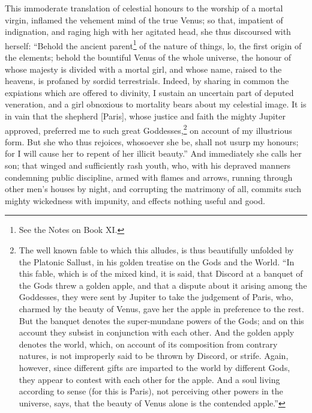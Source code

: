 \documentclass[12pt]{article}
\begin{document}
This immoderate translation of celestial honours to the worship of a mortal
virgin, inflamed the vehement mind of the true Venus; so that, impatient of
indignation, and raging high with her agitated head, she thus discoursed with
herself: ``Behold the ancient parent\footnote{See the Notes on Book XI.} of the
nature of things, lo, the first origin of the elements; behold the bountiful
Venus of the whole universe, the honour of whose majesty is divided with a
mortal girl, and whose name, raised to the heavens, is profaned by sordid
terrestrials. Indeed, by sharing in common the expiations which are offered to
divinity, I sustain an uncertain part of deputed veneration, and a girl
obnoxious to mortality bears about my celestial image. It is in vain that the
shepherd [Paris], whose justice and faith the mighty Jupiter approved,
preferred me to such great Goddesses,\footnote{The well known fable to which
this alludes, is thus beautifully unfolded by the Platonic Sallust, in his
golden treatise on the Gods and the World. ``In this fable, which is of the
mixed kind, it is said, that Discord at a banquet of the Gods threw a golden
apple, and that a dispute about it arising among the Goddesses, they were sent
by Jupiter to take the judgement of Paris, who, charmed by the beauty of Venus,
gave her the apple in preference to the rest. But the banquet denotes the
super-mundane powers of the Gods; and on this account they subsist in
conjunction with each other. And the golden apply denotes the world, which, on
account of its composition from contrary natures, is not improperly said to be
thrown by Discord, or strife. Again, however, since different gifts are
imparted to the world by different Gods, they appear to contest with each other
for the apple. And a soul living according to sense (for this is Paris), not
perceiving other powers in the universe, says, that the beauty of Venus alone
is the contended apple.''} on account of my illustrious form. But she who thus
rejoices, whosoever she be, shall not usurp my honours; for I will cause her to
repent of her illicit beauty.'' And immediately she calls her son; that winged
and sufficiently rash youth, who, with his depraved manners condemning public
discipline, armed with flames and arrows, running through other men's houses by
night, and corrupting the matrimony of all, commits such mighty wickedness with
impunity, and effects nothing useful and good.
\end{document}
